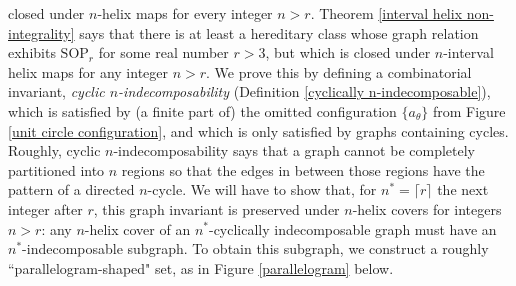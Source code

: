 \documentclass{amsart}
\theoremstyle{definition}
\theoremstyle{remark}
\numberwithin{equation}{section}
\begin{document}
closed under $n$-helix maps for every integer $n > r$. Theorem \ref{interval helix non-integrality} says that there is at least a hereditary class whose graph relation exhibits $\mathrm{SOP}_{r}$ for some real number $r > 3$, but which is closed under $n$-interval helix maps for any integer $n > r$. We prove this by defining a combinatorial invariant, \textit{cyclic $n$-indecomposability} (Definition \ref{cyclically n-indecomposable}), which is satisfied by (a finite part of) the omitted configuration $\{a_{\theta}\}$ from Figure \ref{unit circle configuration}, and which is only satisfied by graphs containing cycles. Roughly, cyclic $n$-indecomposability says that a graph cannot be completely partitioned into $n$ regions so that the edges in between those regions have the pattern of a directed $n$-cycle. We will have to show that, for $n^{*} = \lceil r \rceil$ the next integer after $r$, this graph invariant is preserved under $n$-helix covers for integers $n >r $: any $n$-helix cover of an $n^{*}$-cyclically indecomposable graph must have an $n^{*}$-indecomposable subgraph. To obtain this subgraph, we construct a roughly ``parallelogram-shaped" set, as in Figure \ref{parallelogram} below.
\end{document}
